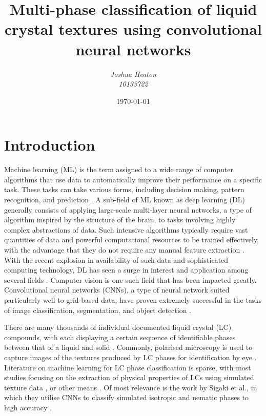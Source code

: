 \documentclass[12pt]{article}
\begin{document}
\title{Multi-phase classification of liquid crystal textures using convolutional neural networks}
\author{\textit{Joshua Heaton}\\\textit{10133722}}
\date{\today}

\maketitle

\begin{abstract}
\end{abstract}

\newpage
\tableofcontents

\newpage
{}

\section{Introduction}
Machine learning (ML) is the term assigned to a wide range of computer algorithms that use data to automatically improve their performance on a specific task. These tasks can take various forms, including decision making, pattern recognition, and prediction  \cite{Murphy12}. A sub-field of ML known as deep learning (DL) generally consists of applying large-scale multi-layer neural networks, a type of algorithm inspired by the structure of the brain, to tasks involving highly complex abstractions of data. Such intensive algorithms typically require vast quantities of data and powerful computational resources to be trained effectively, with the advantage that they do not require any manual feature extraction \cite{Goodfellow16}. With the recent explosion in availability of such data and sophisticated computing technology, DL has seen a surge in interest and application among several fields \cite{Shrestha19}. Computer vision is one such field that has been impacted greatly. Convolutional neural networks (CNNs), a type of neural network suited particularly well to grid-based data, have proven extremely successful in the tasks of image classification, segmentation, and object detection \cite{Voulodimos18}.

There are many thousands of individual documented liquid crystal (LC) compounds, with each displaying a certain sequence of identifiable phases between that of a liquid and solid \cite{Dierking03}. Commonly, polarised microscopy is used to capture images of the textures produced by LC phases for identification by eye \cite{Dierking03}. Literature on machine learning for LC phase classification is sparse, with most studies focusing on the extraction of physical properties of LCs using simulated texture data \cite{Sigaki20, Sigaki19, Minor20, Walters19}, or other means \cite{Florin07, Butnariu13, Doi19, Inokuchi20}. Of most relevance is the work by Sigaki et al., in which they utilise CNNs to classify simulated isotropic and nematic phases to high accuracy \cite{Sigaki20}.
\end{document}
